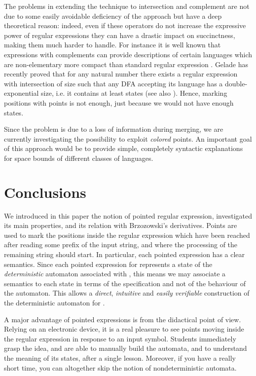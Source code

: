 \documentclass[preprint]{sigplanconf}
\begin{document}
The problems in extending the technique to intersection and complement are
not due to some easily avoidable deficiency of the approach but 
have a deep theoretical reason: indeed, even if these operators do not increase
the expressive power of regular expressions they can have a drastic
impact on succinctness, making them much harder to handle.
For instance it is well known that expressions with
complements can provide descriptions of certain languages which are
non-elementary more compact than standard regular expression \cite{MeyerS72}.
Gelade \cite{Gelade10} has recently proved that for any natural 
number  there exists a regular expression with intersection
of size  such that any DFA accepting its language has
a double-exponential size, i.e. it contains at least  states
(see also \cite{GruberH08}).
Hence, marking positions with points is not enough, just because we 
would not have enough states. 

Since the problem is due to a loss of information
during merging, we are currently investigating the possibility
to exploit {\em colored} points. An important goal of this
approach would be to provide simple, completely
syntactic explanations for space bounds of different classes
of languages.

\section{Conclusions}
We introduced in this paper the notion of pointed regular
expression, investigated its main properties, and its 
relation with Brzozowski's derivatives. 
Points are used to mark the positions inside the regular
expression which have been reached after reading some prefix of
the input string, and where the processing
of the remaining string should start. In particular,
each pointed expression has a clear semantics. Since
each pointed expression for  represents a state of 
the {\em deterministic} automaton associated
with , this means we may associate a semantics to each
state in terms of the specification  
and not of the behaviour of the automaton. 
This allows a {\em direct}, {\em intuitive} and 
{\em easily verifiable} construction of the deterministic 
automaton for . 

A major advantage of pointed expressions 
is from the didactical point of view. Relying on 
an electronic device, it is a real pleasure to see
points moving inside the regular expression in response to
an input symbol. Students immediately grasp the idea, and 
are able to manually build the automata, and to understand the
meaning of its states, after a single lesson. Moreover, if you 
have a really short time, you can altogether skip the notion of 
nondeterministic automata.
\end{document}
